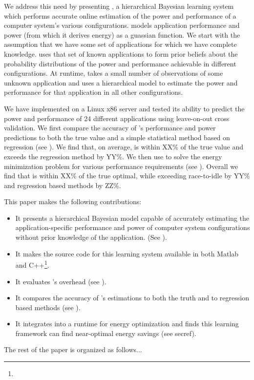 We address this need by presenting \SYSTEM{}, a hierarchical Bayesian learning system which performs accurate online estimation of the power and performance of a computer system's various configurations.  \SYSTEM{} models application performance and power (from which it derives energy) as a guassian function.  We start with the assumption that we have some set of applications for which we have complete knowledge.  \SYSTEM{} uses that set of known applications to form prior beliefs about the probability distributions of the power and performance achievable in different configurations.  At runtime, \SYSTEM{} takes a small number of observations of some unknown application and uses a hierarchical model to estimate the power and performance for that application in all other configurations.

We have implemented \SYSTEM{} on a Linux x86 server and tested its ability to predict the power and performance of 24 different applications using leave-on-out cross validation.  We first compare the accuracy of \SYSTEM{}'s performance and power predictions to both the true value and a simple statistical method based on regression (see \secref{}).  We find that, on average, \SYSTEM{} is within XX\% of the true value and exceeds the regression method by YY\%.  We then use \SYSTEM{} to solve the energy minimization problem for various performance requirements (see \secref{}).  Overall we find that \SYSTEM{} is within XX\% of the true optimal, while exceeding race-to-idle by YY\% and regression based methods by ZZ\%.

This paper makes the following contributions:
\begin{itemize}
\item It presents a hierarchical Bayesian model capable of accurately estimating the application-specific performance and power of computer system configurations without prior knowledge of the application. (See ).
\item It makes the source code for this learning system available in both Matlab and C++\footnote{}.
\item It evaluates \SYSTEM{}'s overhead (see ).
\item It compares the accuracy of \SYSTEM{}'s estimations to both the truth and to regression based methods (see \secref{}).
\item It integrates \SYSTEM{} into a runtime for energy optimization and finds this learning framework can find near-optimal energy savings (see secref{}).
\end{itemize}

The rest of the paper is organized as follows...